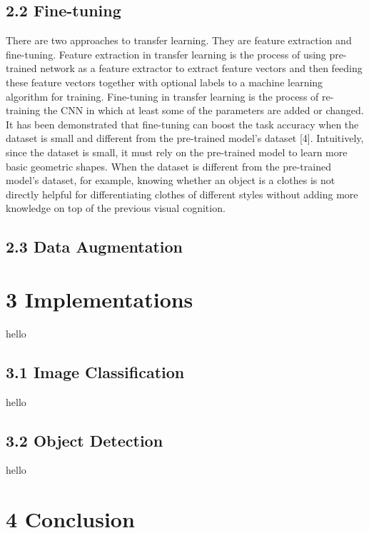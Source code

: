 \documentclass[12pt]{article}
\begin{document}
\subsection*{2.2 \hspace{10pt} Fine-tuning}
There are two approaches to transfer learning. They are feature extraction and fine-tuning.
Feature extraction in transfer learning is the process of using pre-trained network as a feature extractor to extract feature vectors and then feeding these feature vectors together with optional labels to a machine learning algorithm for training. Fine-tuning in transfer learning is the process of re-training the CNN in which at least some of the parameters are added or changed. It has been demonstrated that fine-tuning can boost the task accuracy when the dataset is small and different from the pre-trained model’s dataset [4]. Intuitively, since the dataset is small, it must rely on the pre-trained model to learn more basic geometric shapes. When the dataset is different from the pre-trained model's dataset, for example, knowing whether an object is a clothes is not directly helpful for differentiating clothes of different styles without adding more knowledge on top of the previous visual cognition.

\subsection*{2.3 \hspace{10pt} Data Augmentation}


\section*{\large{3 \hspace{10pt} Implementations}}
hello

\subsection*{3.1 \hspace{10pt} Image Classification}
hello

\subsection*{3.2 \hspace{10pt} Object Detection}
hello



\section*{\large{4 \hspace{10pt} Conclusion}}
\end{document}
